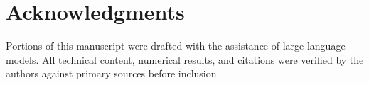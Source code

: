 \section*{Acknowledgments}

Portions of this manuscript were drafted with the assistance of large language models. All technical content, numerical results, and citations were verified by the authors against primary sources before inclusion.
